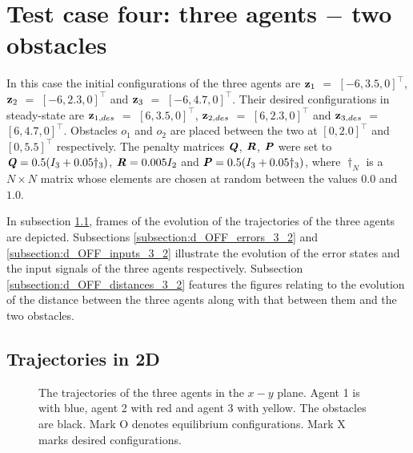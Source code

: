 \section{Test case four: three agents $-$ two obstacles}

In this case the initial configurations of the three agents are
$\bm{\mathbf{z}}_1$ $=$ $[-6, 3.5, 0]^{\top}$,
$\bm{\mathbf{z}}_2$ $=$ $[-6, 2.3, 0]^{\top}$ and
$\bm{\mathbf{z}}_3$ $=$ $[-6, 4.7, 0]^{\top}$.
Their desired configurations in steady-state are
$\bm{\mathbf{z}}_{1,des}$ $=$ $[6, 3.5, 0]^{\top}$,
$\bm{\mathbf{z}}_{2,des}$ $=$ $[6, 2.3, 0]^{\top}$ and
$\bm{\mathbf{z}}_{3,des}$ $=$ $[6, 4.7, 0]^{\top}$.
Obstacles $o_1$ and $o_2$ are placed between the two at $[0, 2.0]^{\top}$
and $[0, 5.5]^{\top}$ respectively. The penalty
matrices $\bm{\mathit{Q}}$, $\bm{\mathit{R}}$, $\bm{\mathit{P}}$ were set to
$\bm{\mathit{Q}} = 0.5 (I_3 + 0.05\dagger_3)$, $\bm{\mathit{R}} = 0.005 I_2$ and
$\bm{\mathit{P}} = 0.5 (I_3 + 0.05\dagger_3)$, where $\dagger_N$ is a $N \times N$
matrix whose elements are chosen at random between the values $0.0$ and $1.0$.

In subsection \ref{subsection:d_OFF_trajectories_3_2}, frames of the evolution of the
trajectories of the three agents are depicted. Subsections
\ref{subsection:d_OFF_errors_3_2} and \ref{subsection:d_OFF_inputs_3_2} illustrate
the evolution of the error states and the input signals of the three agents
respectively. Subsection \ref{subsection:d_OFF_distances_3_2} features the
figures relating to the evolution of the distance between the three agents
along with that between them and the two obstacles.


\subsection{Trajectories in 2D}
\label{subsection:d_OFF_trajectories_3_2}

\begin{figure}[H]
  \scalebox{0.9}{}
  \caption{The trajectories of the three agents in the $x-y$ plane. Agent 1 is with
    blue, agent 2 with red and agent 3 with yellow. The obstacles are black.
    Mark O denotes equilibrium configurations. Mark X marks desired configurations.}
  \label{fig:d_OFF_trajectory_3_2}
\end{figure}



